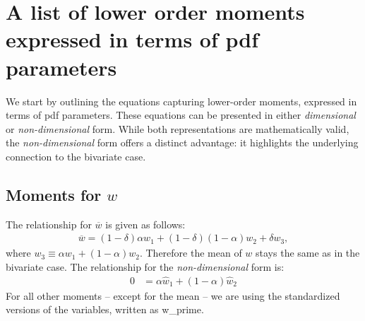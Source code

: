 \section{A list of lower order moments expressed in terms of pdf parameters}
\label{sec:a-list-of-lower-order-moments-expressed-in-terms-of-pdf-parameters}

We start by outlining the equations capturing lower-order moments,
expressed in terms of \gls{pdf} parameters.
These equations can be presented in either \emph{dimensional} or \emph{non-dimensional} form.
While both representations are mathematically valid,
the \emph{non-dimensional} form offers a distinct advantage:
it highlights the underlying connection to the bivariate case.

\subsection{Moments for \texorpdfstring{$w$}{w}}\label{subsec:lowerordermoments_w}

The relationship for $\overline{w}$ is given as follows:
\begin{align}
    \label{eq:w_bar}
    \overline{w} = (1 - \delta) \alpha w_1 + (1 - \delta)(1-\alpha) w_2 + \delta w_3,
\end{align}
where $w_3 \equiv \alpha w_1 + (1 - \alpha) w_2$.
Therefore the mean of $w$ stays the same as in the bivariate case.
The relationship for the \emph{non-dimensional} form is:
\begin{align}
    \label{eq:w_bar_nondim}
    0 &= \alpha \widehat{w}_1 + (1 - \alpha) \widehat{w}_2
\end{align}
For all other moments -- except for the mean --
we are using the standardized versions of the variables, written as \gls{w_prime}.

